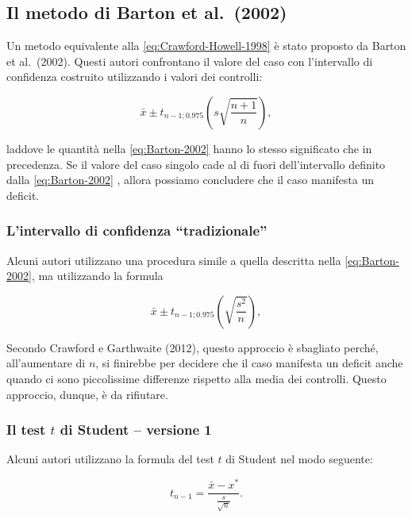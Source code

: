 \documentclass[
  11pt,
]{krantz}
\theoremstyle{definition}
\theoremstyle{definition}
\theoremstyle{definition}
\theoremstyle{definition}
\theoremstyle{remark}
\begin{document}
\hypertarget{sec:barton-2002}{%
\subsection{Il metodo di Barton et al.~(2002)}\label{sec:barton-2002}}

Un metodo equivalente alla \eqref{eq:Crawford-Howell-1998} è stato proposto da Barton et al.~(2002). Questi autori confrontano il valore del caso con l'intervallo di confidenza costruito utilizzando i valori dei controlli:

\[
\bar{x} \pm t_{n-1; 0.975} \left(s \sqrt{\frac{n+1}{n}} \right),
\label{eq:Barton-2002}
\]

laddove le quantità nella \eqref{eq:Barton-2002} hanno lo stesso significato che in precedenza. Se il valore del caso singolo cade al di fuori dell'intervallo definito dalla \eqref{eq:Barton-2002} , allora possiamo concludere che il caso manifesta un deficit.

\hypertarget{lintervallo-di-confidenza-tradizionale}{%
\subsubsection{L'intervallo di confidenza ``tradizionale''}\label{lintervallo-di-confidenza-tradizionale}}

Alcuni autori utilizzano una procedura simile a quella descritta nella \eqref{eq:Barton-2002}, ma utilizzando la formula

\[
\bar{x} \pm t_{n-1; 0.975} \left(\sqrt{\frac{s^2}{n}} \right),
\label{eq:Barton-2002-b}
\]

Secondo Crawford e Garthwaite (2012), questo approccio è sbagliato perché, all'aumentare di \(n\), si finirebbe per decidere che il caso manifesta un deficit anche quando ci sono piccolissime differenze rispetto alla media dei controlli. Questo approccio, dunque, è da rifiutare.

\hypertarget{il-test-t-di-student-versione-1}{%
\subsubsection{\texorpdfstring{Il test \(t\) di Student -- versione 1}{Il test t di Student -- versione 1}}\label{il-test-t-di-student-versione-1}}

Alcuni autori utilizzano la formula del test \(t\) di Student nel modo seguente:

\[
t_{n-1} = \frac{\bar{x} - x^*}{\frac{s}{\sqrt{n}}}.
\label{eq:ttest-mean-case}
\]
\end{document}
